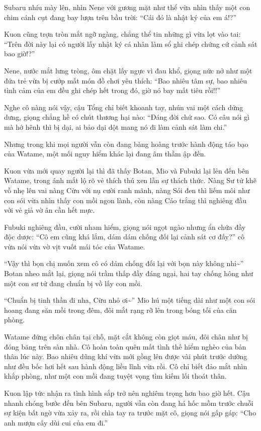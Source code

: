 \documentclass[../main.tex]{subfiles}
\begin{document}
Subaru nhíu mày lên, nhìn Nene với gương mặt như thể vừa nhìn thấy một con chim cánh cụt đang bay lượn trên bầu trời: ``Cái đó là nhật ký của em á!?''

Kuon cũng trợn tròn mắt ngỡ ngàng, chẳng thể tin những gì vừa lọt vào tai: ``Trên đời này lại có người lấy nhật ký cá nhân làm sổ ghi chép chứng cứ cảnh sát bao giờ!?''

Nene, nước mắt lưng tròng, ôm chặt lấy ngực vì đau khổ, giọng nức nở như một đứa trẻ vừa bị cướp mất món đồ chơi yêu thích: ``Bao nhiêu tâm sự, bao nhiêu tình cảm của em đều ghi chép hết trong đó, giờ nó bay mất tiêu rồi!!''

Nghe cô nàng nói vậy, cậu Tổng chỉ biết khoanh tay, nhún vai một cách dửng dưng, giọng chẳng hề có chút thương hại nào: ``Đáng đời chứ sao. Có câu nói gì mà hớ hênh thì bị dại, ai bảo dại dột mang nó đi làm cảnh sát làm chi.''

Nhưng trong khi mọi người vẫn còn đang bàng hoàng trước hành động táo bạo của Watame, một mối nguy hiểm khác lại đang âm thầm ập đến.

Kuon vừa mới quay người lại thì đã thấy Botan, Mio và Fubuki lại lẻn đến bên Watame, trong ánh mắt lộ rõ vẻ thích thú xen lẫn sự thách thức. Nàng Sư tử khẽ vỗ nhẹ lên vai nàng Cừu với nụ cười ranh mãnh, nàng Sói đen thì liếm môi như con sói vừa nhìn thấy con mồi ngon lành, còn nàng Cáo trắng thì nghiêng đầu với vẻ giả vờ ân cần hết mực.

Fubuki nghiêng đầu, cười nham hiểm, giọng nói ngọt ngào nhưng ẩn chứa đầy độc dược: ``Cô em cũng khá lắm, dám dám chống đối lại cảnh sát cơ đấy?'' cô vừa nói vừa vờ vịt vuốt mái tóc của Watame.

``Vậy thì bọn chị muốn xem cô có dám chống đối lại với bọn này không nhỉ\~{}'' Botan nheo mắt lại, giọng nói trầm thấp đầy đáng ngại, hai tay chống hông như một con sư tử đang chuẩn bị vồ lấy con mồi.

``Chuẩn bị tinh thần đi nha, Cừu nhỏ ơi\~{}'' Mio hú một tiếng dài như một con sói hoang đang săn mồi trong đêm, đôi mắt rạng rỡ lên trong bóng tối của căn phòng.

Watame đứng chôn chân tại chỗ, mặt cắt không còn giọt máu, đôi chân như bị đóng băng trên sàn nhà. Cô hoàn toàn quên mất tình thế hiểm nghèo của bản thân lúc này. Bao nhiêu dũng khí vừa mới gồng lên được vài phút trước dường như đều bốc hơi hết sau hành động liều lĩnh vừa rồi. Cô chỉ biết đảo mắt nhìn khắp phòng, như một con mồi đang tuyệt vọng tìm kiếm lối thoát thân.

Kuon lập tức nhận ra tình hình sắp trở nên nghiêm trọng hơn bao giờ hết. Cậu nhanh chóng bước đến bên Subaru, người vẫn còn đang há hốc mồm trước chuỗi sự kiện bất ngờ vừa xảy ra, rồi chìa tay ra trước mặt cô, giọng nói gấp gáp: ``Cho anh mượn cây dùi cui của em đi.''
\end{document}
